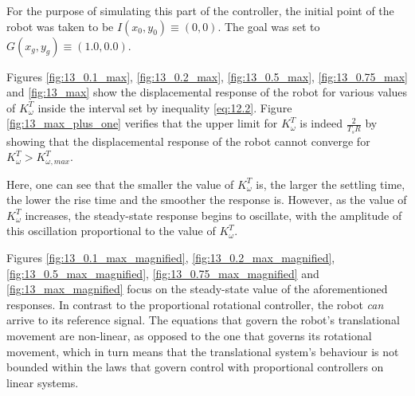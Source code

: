 For the purpose of simulating this part of the controller, the initial point of
the robot was taken to be $I(x_0, y_0) \equiv (0, 0)$. The goal was set to
$G(x_g, y_g) \equiv (1.0, 0.0)$.

Figures \ref{fig:13_0.1_max}, \ref{fig:13_0.2_max}, \ref{fig:13_0.5_max},
\ref{fig:13_0.75_max} and \ref{fig:13_max} show the displacemental response of
the robot for various values of $K_{\omega}^T$ inside the interval set by
inequality \ref{eq:12.2}. Figure \ref{fig:13_max_plus_one} verifies that the
upper limit for $K_{\omega}^T$ is indeed $\frac{2}{T_s R}$ by showing that the
displacemental response of the robot cannot converge for
$K_{\omega}^T > K_{\omega,max}^T$.

Here, one can see that the smaller the value of $K_{\omega}^T$ is, the larger
the settling time, the lower the rise time and the smoother the response is.
However, as the value of $K_{\omega}^T$ increases, the steady-state response
begins to oscillate, with the amplitude of this oscillation proportional to the
value of $K_{\omega}^T$.

Figures \ref{fig:13_0.1_max_magnified}, \ref{fig:13_0.2_max_magnified},
\ref{fig:13_0.5_max_magnified}, \ref{fig:13_0.75_max_magnified} and
\ref{fig:13_max_magnified} focus on the steady-state value of the aforementioned
responses. In contrast to the proportional rotational controller, the robot
\textit{can} arrive to its reference signal. The equations that govern the
robot's translational movement are non-linear, as opposed to the one that
governs its rotational movement, which in turn means that the translational
system's behaviour is not bounded within the laws that govern control with
proportional controllers on linear systems.


\noindent{}

